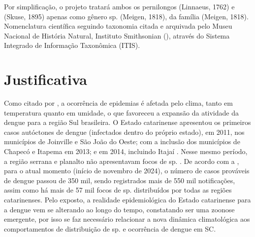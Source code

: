 \indent Por simplificação, o projeto tratará ambos os pernilongos  (Linnaeus, 1762) e  (Skuse, 1895) apenas como gênero  sp. (Meigen, 1818), da família  (Meigen, 1818). Nomenclatura científica seguindo taxonomia citada e arquivada pelo Museu Nacional de História Natural, Instituto Smithsonian (\citeyear{ITIS}), através do Sistema Integrado de Informação Taxonômica (\acrfull{ITIS}).



\newpage
\section{Justificativa}
\indent Como citado por , a ocorrência de epidemias é afetada pelo clima, tanto em temperatura quanto em umidade, o que favoreceu a expansão da atividade da dengue para a região Sul brasileira. O Estado catarinense apresentou os primeiros casos autóctones de dengue (infectados dentro do próprio estado), em 2011, nos municípios de Joinville e São João do Oeste; com a inclusão dos municípios de Chapecó e Itapema em 2013; e em 2014, incluindo Itajaí \cite{OTPCampo}. Nesse mesmo período, a região serrana e planalto não apresentavam focos de  sp. \cite{Matiola2020Dissertação}. De acordo com a , para o atual momento (início de novembro de 2024), o número de casos prováveis de dengue passou de 350 mil, sendo registrados mais de 550 mil notificações, assim como há mais de 57 mil focos de  sp. distribuídos por todas as regiões catarinenses. Pelo exposto, a realidade epidemiológica do Estado catarinense para a dengue vem se alterando ao longo do tempo, constatando ser uma zoonose emergente, por isso se faz necessário relacionar a nova dinâmica climatológica aos comportamentos de distribuição de  sp. e ocorrência de dengue em \acrlong{SC}.


 
